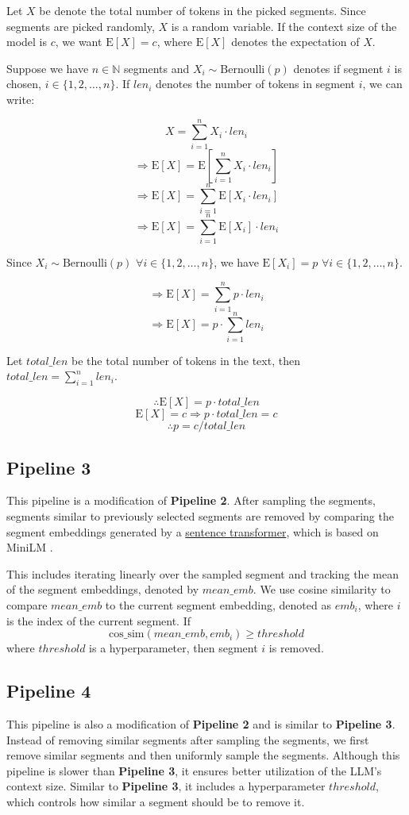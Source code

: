 Let $X$ be denote the total number of tokens in the picked segments.
Since segments are picked randomly, $X$ is a random variable.
If the context size of the model is $c$, we want $\mathrm{E}[X] = c$, where $\mathrm{E}[X]$
denotes the expectation of $X$.

Suppose we have $n \in \mathbb{N}$ segments and $X_i \sim \mathrm{Bernoulli}(p)$ denotes
if segment $i$ is chosen, $i \in \{1, 2, \dots, n\}$.
If $len_i$ denotes the number of tokens in segment $i$, we can write:

\[ X = \sum_{i = 1}^{n} X_i \cdot len_i \]
\[ \Rightarrow \mathrm{E}[X] = \mathrm{E}[\sum_{i = 1}^{n} X_i \cdot len_i] \]
\[ \Rightarrow \mathrm{E}[X] = \sum_{i = 1}^{n} \mathrm{E}[X_i \cdot len_i] \]
\[ \Rightarrow \mathrm{E}[X] = \sum_{i = 1}^{n} \mathrm{E}[X_i] \cdot len_i \]

Since $X_i \sim \mathrm{Bernoulli}(p)$ $\forall i \in \{1, 2, \dots, n\}$, we
have $\mathrm{E}[X_i] = p$ $\forall i \in \{1, 2, \dots, n\}$.

\[ \Rightarrow \mathrm{E}[X] = \sum_{i = 1}^{n} p \cdot len_i \]
\[ \Rightarrow \mathrm{E}[X] = p \cdot \sum_{i = 1}^{n} len_i \]

Let $total\_len$ be the total number of tokens in the text, then
$total\_len = \sum_{i = 1}^{n} len_i$.

\[ \therefore \mathrm{E}[X] = p \cdot total\_len \]
\[ \mathrm{E}[X] = c \Rightarrow p \cdot total\_len = c \]
\[ \therefore p = c / total\_len \]


\subsection*{Pipeline 3}

This pipeline is a modification of \textbf{Pipeline 2}.
After sampling the segments, segments similar to previously selected segments are removed
by comparing the segment embeddings generated by a
\href{https://huggingface.co/sentence-transformers/all-MiniLM-L6-v2}{sentence transformer},
which is based on MiniLM \cite{wang2020minilm}.

This includes iterating linearly over the sampled segment and tracking the mean of the segment
embeddings, denoted by $mean\_emb$.
We use cosine similarity to compare $mean\_emb$ to the current segment embedding,
denoted as $emb_i$, where $i$ is the index of the current segment.
If \[ \mathrm{cos\_sim}(mean\_emb, emb_i) \ge threshold \]
where $threshold$ is a hyperparameter, then segment $i$ is removed.


\subsection*{Pipeline 4}

This pipeline is also a modification of \textbf{Pipeline 2} and is similar to
\textbf{Pipeline 3}.
Instead of removing similar segments after sampling the segments, we first remove similar
segments and then uniformly sample the segments.
Although this pipeline is slower than \textbf{Pipeline 3}, it ensures better utilization of
the LLM's context size.
Similar to \textbf{Pipeline 3}, it includes a hyperparameter $threshold$, which controls
how similar a segment should be to remove it.

